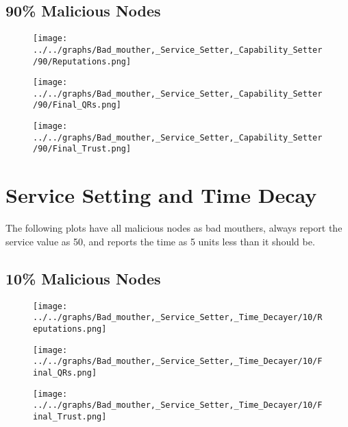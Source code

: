 \begin{minipage}[t]{0.49\columnwidth}
\subsection*{90\% Malicious Nodes}
    \begin{figure}[H]
        \centering
        \texttt{[image: ../../graphs/Bad\_mouther,\_Service\_Setter,\_Capability\_Setter/90/Reputations.png]}
    \end{figure}
    \begin{figure}[H]
        \centering
        \texttt{[image: ../../graphs/Bad\_mouther,\_Service\_Setter,\_Capability\_Setter/90/Final\_QRs.png]}
    \end{figure}
\end{minipage}
\begin{minipage}[t]{0.49\columnwidth}
    \begin{figure}[H]
        \centering
        \texttt{[image: ../../graphs/Bad\_mouther,\_Service\_Setter,\_Capability\_Setter/90/Final\_Trust.png]}
    \end{figure}
\end{minipage}
\newpage

\section*{Service Setting and Time Decay}
The following plots have all malicious nodes as bad mouthers, always
report the service value as 50, and reports the time as 5 units less than
it should be.
\\
\begin{minipage}[t]{0.49\columnwidth}
\subsection*{10\% Malicious Nodes}
    \begin{figure}[H]
        \centering
        \texttt{[image: ../../graphs/Bad\_mouther,\_Service\_Setter,\_Time\_Decayer/10/Reputations.png]}
    \end{figure}
    \begin{figure}[H]
        \centering
        \texttt{[image: ../../graphs/Bad\_mouther,\_Service\_Setter,\_Time\_Decayer/10/Final\_QRs.png]}
    \end{figure}
\end{minipage}
\begin{minipage}[t]{0.49\columnwidth}
    \begin{figure}[H]
        \centering
        \texttt{[image: ../../graphs/Bad\_mouther,\_Service\_Setter,\_Time\_Decayer/10/Final\_Trust.png]}
    \end{figure}
\end{minipage}

